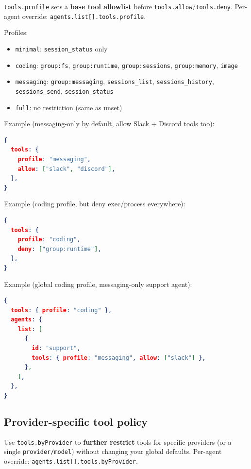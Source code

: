 \texttt{tools.profile} sets a \textbf{base tool allowlist} before \texttt{tools.allow}/\texttt{tools.deny}.
Per-agent override: \texttt{agents.list[].tools.profile}.

Profiles:

\begin{itemize}
  \item \texttt{minimal}: \texttt{session\_status} only
  \item \texttt{coding}: \texttt{group:fs}, \texttt{group:runtime}, \texttt{group:sessions}, \texttt{group:memory}, \texttt{image}
  \item \texttt{messaging}: \texttt{group:messaging}, \texttt{sessions\_list}, \texttt{sessions\_history}, \texttt{sessions\_send}, \texttt{session\_status}
  \item \texttt{full}: no restriction (same as unset)
\end{itemize}


Example (messaging-only by default, allow Slack + Discord tools too):

\begin{lstlisting}[language=json]
{
  tools: {
    profile: "messaging",
    allow: ["slack", "discord"],
  },
}
\end{lstlisting}


Example (coding profile, but deny exec/process everywhere):

\begin{lstlisting}[language=json]
{
  tools: {
    profile: "coding",
    deny: ["group:runtime"],
  },
}
\end{lstlisting}


Example (global coding profile, messaging-only support agent):

\begin{lstlisting}[language=json]
{
  tools: { profile: "coding" },
  agents: {
    list: [
      {
        id: "support",
        tools: { profile: "messaging", allow: ["slack"] },
      },
    ],
  },
}
\end{lstlisting}


\subsection{Provider-specific tool policy}


Use \texttt{tools.byProvider} to \textbf{further restrict} tools for specific providers
(or a single \texttt{provider/model}) without changing your global defaults.
Per-agent override: \texttt{agents.list[].tools.byProvider}.

